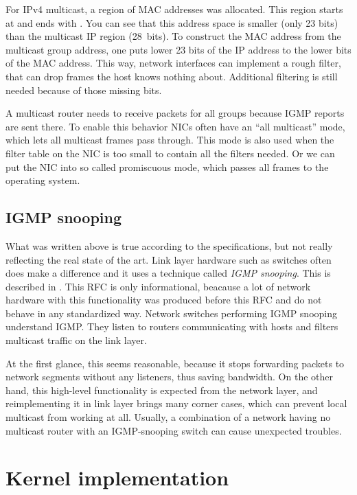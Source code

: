 For IPv4 multicast, a region of MAC addresses was allocated. This region starts
at  and ends with . You can see
that this address space is smaller (only 23 bits) than the multicast IP region
(28~bits). To construct the MAC address from the multicast group address, one
puts lower 23 bits of the IP address to the lower bits of the MAC address. This
way, network interfaces can implement a rough filter, that can drop frames the
host knows nothing about. Additional filtering is still needed because of those
missing bits.

A multicast router needs to receive packets for all groups because IGMP reports
are sent there. To enable this behavior NICs often have an ``all multicast''
mode, which lets all multicast frames pass through. This mode is also used when
the filter table on the NIC is too small to contain all the filters needed. Or
we can put the NIC into so called promiscuous mode, which passes all frames
to the operating system.

\subsection{IGMP snooping}

What was written above is true according to the specifications, but not really
reflecting the real state of the art. Link layer hardware such as switches often does
make a difference and it uses a technique called \emph{IGMP snooping}. This is described
in . This RFC is only informational, beacause a lot of network hardware with
this functionality was produced before this RFC and do not behave in any
standardized way. Network switches performing IGMP snooping understand IGMP. They
listen to routers communicating with hosts and filters multicast traffic on
the link layer.

At the first glance, this seems reasonable, because it stops forwarding packets
to network segments without any listeners, thus saving bandwidth. On the other
hand, this high-level functionality is expected from the network layer, and
reimplementing it in link layer brings many corner cases, which can prevent
local multicast from working at all. Usually, a combination of a network having no
multicast router with an IGMP-snooping switch can cause unexpected troubles.

\def\setsockopt{\texttt{setsockopt} }
\section{Kernel implementation}

